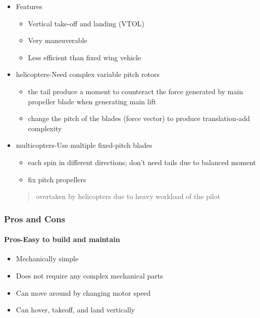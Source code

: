 \documentclass[]{article}
\let\oldparagraph\paragraph
\renewcommand{\paragraph}[1]{\oldparagraph{#1}\mbox{}}
\begin{document}
\begin{itemize}
\item
  Features

  \begin{itemize}
  \item
    Vertical take-off and landing (VTOL)
  \item
    Very maneuverable
  \item
    Less efficient than fixed wing vehicle
  \end{itemize}
\item
  helicopters-Need complex variable pitch rotors

  \begin{itemize}
  \item
    the tail produce a moment to counteract the force generated by main
    propeller blade when generating main lift
  \item
    change the pitch of the blades (force vector) to produce
    translation-add complexity
  \end{itemize}
\item
  multicopters-Use multiple fixed-pitch blades

  \begin{itemize}
  \item
    each spin in different directions; don't need tails due to balanced
    moment
  \item
    fix pitch propellers 
  \end{itemize}

  \begin{quote}
  overtaken by helicopters due to heavy workload of the pilot
  \end{quote}
\end{itemize}

\subsubsection{Pros and Cons}\label{header-n208}

\paragraph{Pros-Easy to build and maintain}\label{header-n209}

\begin{itemize}
\item
  Mechanically simple
\item
  Does not require any complex mechanical parts
\item
  Can move around by changing motor speed
\item
  Can hover, takeoff, and land vertically
\end{itemize}
\end{document}
